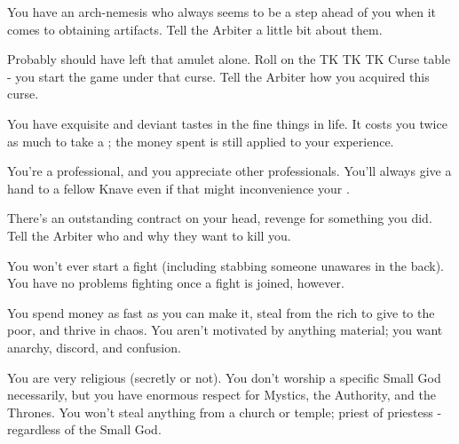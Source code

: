 {    
    
    You have an arch-nemesis who always seems to be a step ahead of you when it comes to obtaining artifacts. Tell the Arbiter a little bit about them.


    Probably should have left that amulet alone.  Roll on the TK TK TK Curse table - you start the game under that curse.  Tell the Arbiter how you acquired this curse.


    You have exquisite and deviant tastes in the fine things in life. It costs you twice as much to take a ; the money spent is still applied to your experience.


    You're a professional, and you appreciate other professionals.  You'll always give a hand to a fellow Knave even if that might inconvenience your .


    There's an outstanding contract on your head, revenge for something you did.  Tell the Arbiter who and why they want to kill you.


    You won't ever start a fight (including stabbing someone unawares in the back).  You have no problems fighting once a fight is joined, however.  

    \newpage 


    You spend money as fast as you can make it, steal from the rich to give to the poor, and thrive in chaos.  You aren't motivated by anything material; you want anarchy, discord, and confusion.    


    You are very religious (secretly or not).  You don't worship a specific Small God necessarily, but you have enormous respect for Mystics, the Authority, and the Thrones.  You won't steal anything from a church or temple; priest of priestess - regardless of the Small God.


}
